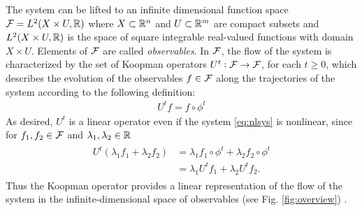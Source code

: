The system can be lifted to an infinite dimensional function space $\mathcal{F} = L^2(X \times U, \mathbb{R})$ where $X \subset \mathbb{R}^n$ and $U \subset \mathbb{R}^m$ are compact subsets and $ L^2(X \times U, \mathbb{R})$ is the space of square integrable real-valued functions with domain $X \times U$.
Elements of $\mathcal{F}$ are called \emph{observables}.
In $\mathcal{F}$, the flow of the system is characterized by the set %
of Koopman operators 
$U^t : \mathcal{F} \to \mathcal{F}$, for each $t \geq 0$,
which describes the evolution of the observables $f \in \mathcal{F}$ along the trajectories of the system according to the following definition:
\begin{align}
    U^t f = f \circ \phi^t      
    \label{eq:koopman}
\end{align}
As desired, $U^t$ is a linear operator even if the system \eqref{eq:nlsys} is nonlinear, since for $f_1, f_2 \in \mathcal{F}$ and $\lambda_1, \lambda_2 \in \mathbb{R}$
\begin{align}
    \begin{split}
    U^t (\lambda_1 f_1 + \lambda_2 f_2) &= \lambda_1 f_1 \circ \phi^t + \lambda_2 f_2 \circ \phi^t \\
    &= \lambda_1 U^t f_1 + \lambda_2 U^t f_2.
    \end{split}
\end{align}
Thus the Koopman operator provides a linear representation of the flow of the system in the infinite-dimensional space of observables (see Fig. \ref{fig:overview}) \cite{budivsic2012applied}. 


